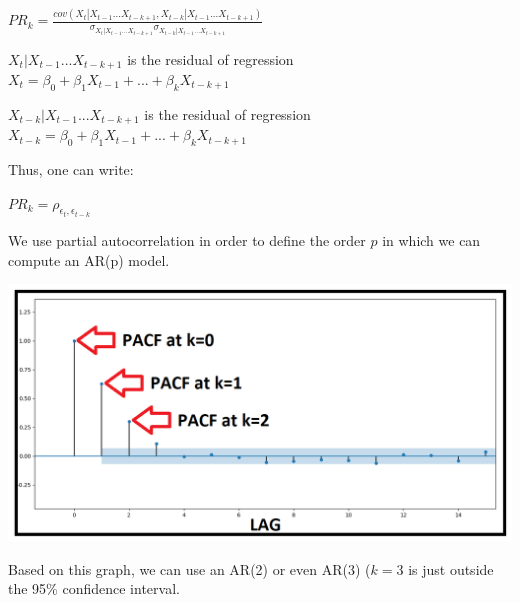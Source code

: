 \begin{center}
$PR_k = \frac{cov(X_t | X_{t-1} ... X_{t-k+1},X_{t-k} | X_{t-1} ... X_{t-k+1})}{\sigma_{X_t | X_{t-1} ... X_{t-k+1}} \sigma_{X_{t-k} | X_{t-1} ... X_{t-k+1}}}$
\end{center}

$X_t | X_{t-1} ... X_{t-k+1}$ is the residual of regression $X_t = \beta_0 + \beta_1 X_{t-1} + ... + \beta_k X_{t-k+1}$

$X_{t-k} | X_{t-1} ... X_{t-k+1}$ is the residual of regression $X_{t-k} = \beta_0 + \beta_1 X_{t-1} + ... + \beta_k X_{t-k+1}$

\vspace{5mm}

Thus, one can write:

\begin{center}
$PR_k = \rho_{\epsilon_t,\epsilon_{t-k}}$
\end{center}

\vspace{5mm}

We use partial autocorrelation in order to define the order $p$ in which we can compute an AR(p) model.

\begin{center}
\includegraphics[scale=0.2]{PACF.png}
\end{center}

\vspace{5mm}

Based on this graph, we can use an AR(2) or even AR(3) ($k=3$ is just outside the 95\% confidence interval.

\vspace{5mm}
